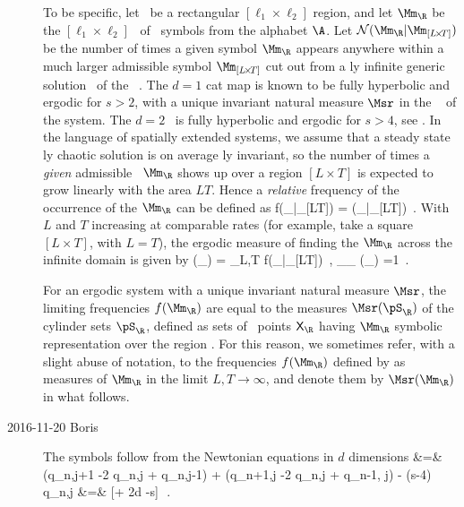 \begin{description}
{To be specific, let \R\  be a   rectangular $[\ell_1\!\times\!\ell_2]$ region,
and let
\(
\Mm_{\R} %
\)
be the  $[\ell_1\!\times\!\ell_2]$
\brick\ of \Mm\ symbols from
the alphabet $\A$.
Let
\(
\mathcal{N}(\Mm_{\R}|\Mm_{[L\!\times\!T]})
\)
be the number of times a given symbol {\brick} $\Mm_{\R}$ appears anywhere within
a much larger admissible symbol {\brick} $\Mm_{[L\!\times\!T]}$
cut out from a {\spt}ly infinite generic solution \Mm\ of the
\catlatt\ .
The $d=1$ cat map is known to be fully hyperbolic and ergodic for $s>2$, with a
unique invariant natural measure $\Msr$  in the \statesp\
 of the system.
The $d=2$  \catlatt\  is fully hyperbolic and ergodic for
$s>4$, see . In the language of spatially extended systems, we
assume that a steady state {\spt}ly chaotic solution is on average
{\spt}ly invariant, so the number of times a \emph{given} admissible
\brick\ $\Mm_{\R}$ shows up over a region $[L\!\times\!T]$ is expected to grow
linearly with the area $LT$. Hence a \emph{relative} frequency of the
occurrence of  the {\brick} $\Mm_{\R}$ can be defined as
\beq
f(\Mm_{\R}|\Mm_{[L\!\times\!T]})
    =
(\Mm_{\R}|\Mm_{[L\!\times\!T]})
\,.
With $L$ and $T$ increasing at comparable rates (for example,
take a square $[L\!\times\!T]$, with $L=T$), the ergodic measure of finding the
{\brick} $\Mm_{\R}$ across the infinite {\spt} domain is given by
\beq
\Msr(\Mm_{\R}) =
\lim_{L,T \to\infty}
f(\Mm_{\R}|\Mm_{[L\!\times\!T]})
\,,\qquad
\sum_{{\Mm_{\R}}} \Msr({\Mm_{\R}}) =1
\,.

\bigskip

For an ergodic system with a  unique invariant natural measure $\Msr$, the
limiting frequencies  $f(\Mm_{\R})$ are equal to the measures $\Msr( \pS_{\R})$
of the cylinder sets $ \pS_{\R}$, defined as sets of \statesp\ points $\Xx_{\R}$
having $\Mm_{\R}$ symbolic representation over the region \R. For this reason, we
sometimes refer, with a slight abuse of notation, to the frequencies
$f(\Mm_{\R})$ defined by \refeq{relFreqR} as measures of $\Mm_{\R}$ in the limit
$L,T \to\infty$, and denote them by $\Msr(\Mm_{\R})$ in what follows.
    }

\item[2016-11-20 Boris]
The {\spt} symbols follow from the Newtonian equations
in $d$ {\spt} dimensions
\bea
{} &=& (q_{n,j+1} -2 q_{n,j} + q_{n,j-1})
         + (q_{n+1,j}  -2 q_{n,j} + q_{n-1, j}) -  (s-4) q_{n,j}
        \continue
{\m} &=& [\Box + 2d -s]\, {\q}
\,.
\label{PC}
\eea


\end{description}
